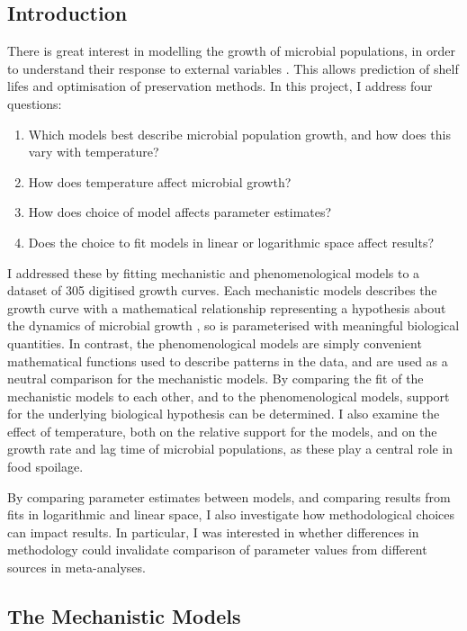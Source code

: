 \documentclass[11pt, a4paper]{article}
\begin{document}
\begin{linenumbers}
    \section{Introduction}
    
    There is great interest in modelling the growth of microbial populations, in order to understand their response to external variables \cite{zwitmodelling}. This allows prediction of shelf lifes and optimisation of preservation methods. In this project, I address four questions:    

\begin{enumerate}
  \item Which models best describe microbial population growth, and how does this vary with temperature?
  \item How does temperature affect microbial growth?
  \item How does choice of model affects parameter estimates?
  \item Does the choice to fit models in linear or logarithmic space affect results?
  \end{enumerate}


I addressed these by fitting mechanistic and phenomenological models to a dataset of 305 digitised growth curves. Each mechanistic models describes the growth curve with a mathematical relationship representing a hypothesis about the dynamics of microbial growth \cite{Buchanan}, so is parameterised with meaningful biological quantities. In contrast, the phenomenological models are simply convenient mathematical functions used to describe patterns in the data, and are used as a neutral comparison for the mechanistic models. By comparing the fit of the mechanistic models to each other, and to the phenomenological models, support for the underlying biological hypothesis can be determined. I also examine the effect of temperature, both on the relative support for the models, and on the growth rate and lag time of microbial populations, as these play a central role in food spoilage. 

By comparing parameter estimates between models, and comparing results from fits in logarithmic and linear space, I also investigate how methodological choices can impact results. In particular, I was interested in whether differences in methodology could invalidate comparison of parameter values from different sources in meta-analyses.

\subsection{The Mechanistic Models}


\end{linenumbers}
\end{document}

